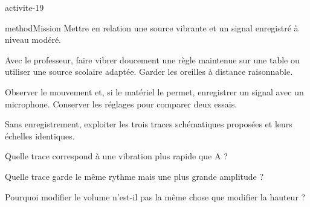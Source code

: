 \documentclass[12pt,twoside,openany]{book}
\begin{document}
\label{ch-19-activite}
\begin{pcFiche}{activite-19}
\begin{pcEncadre}{method}{Mission}
Mettre en relation une source vibrante et un signal enregistré à niveau modéré.\par
\end{pcEncadre}
\begin{questions}
\item Avec le professeur, faire vibrer doucement une règle maintenue sur une table ou utiliser une source scolaire adaptée. Garder les oreilles à distance raisonnable.
\item Observer le mouvement et, si le matériel le permet, enregistrer un signal avec un microphone. Conserver les réglages pour comparer deux essais.
\item Sans enregistrement, exploiter les trois traces schématiques proposées et leurs échelles identiques.
\end{questions}
\begin{questions}
\item Quelle trace correspond à une vibration plus rapide que A ?
\item Quelle trace garde le même rythme mais une plus grande amplitude ?
\item Pourquoi modifier le volume n’est-il pas la même chose que modifier la hauteur ?
\end{questions}
\end{pcFiche}
\label{ch-19-bilan}
\end{document}
